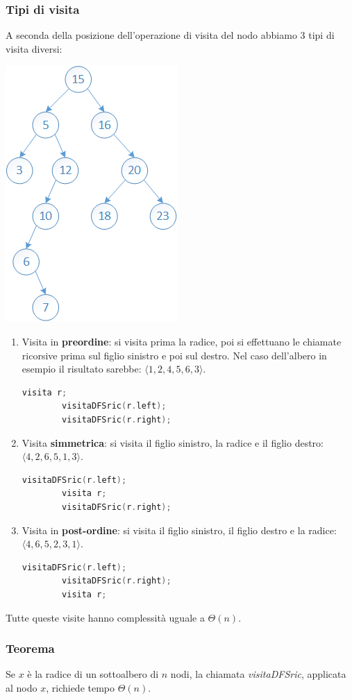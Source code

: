 \documentclass[italian]{article}
\begin{document}
\subsubsection{Tipi di visita}
A seconda della posizione dell'operazione di visita del nodo abbiamo 3 tipi di visita diversi:
\begin{center}
\includegraphics[width=0.2\linewidth]{images/albero_binario_esempio}
\end{center}
\begin{enumerate}
	\item Visita in \textbf{preordine}: si visita prima la radice, poi si effettuano le chiamate ricorsive prima sul figlio sinistro e poi sul destro. Nel caso dell'albero in esempio il risultato sarebbe: $\langle 1,2,4,5,6,3 \rangle$.
	\begin{lstlisting}[language=c,mathescape=true]
		visita r;
		visitaDFSric(r.left);
		visitaDFSric(r.right);
	\end{lstlisting}
	\item Visita \textbf{simmetrica}: si visita il figlio sinistro, la radice e il figlio destro: $\langle 4,2,6,5,1,3 \rangle$.
		\begin{lstlisting}[language=c,mathescape=true]
		visitaDFSric(r.left);
		visita r;
		visitaDFSric(r.right);
		\end{lstlisting}
	\item Visita in \textbf{post-ordine}: si visita il figlio sinistro, il figlio destro e la radice: $\langle 4,6,5,2,3,1 \rangle$.
		\begin{lstlisting}[language=c,mathescape=true]
		visitaDFSric(r.left);
		visitaDFSric(r.right);
		visita r;
		\end{lstlisting}
\end{enumerate}
Tutte queste visite hanno complessità uguale a $\varTheta(n)$.
\pagebreak
\subsubsection{Teorema}
Se $x$ è la radice di un sottoalbero di $n$ nodi, la chiamata \textit{visitaDFSric}, applicata al nodo $x$, richiede tempo $\varTheta(n)$.
\end{document}
